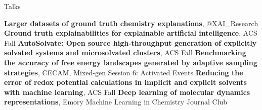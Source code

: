 \begin{rubric}{Talks}

\entry*[\hspace{1.05cm}2023] \textbf{Larger datasets of ground truth chemistry explanations}, $@$XAI\_Research
\entry*[\hspace{1.05cm}2022] \textbf{Ground truth explainabilities for explainable artificial intelligence}, ACS Fall
\entry*[\hspace{1.05cm}2022] \textbf{AutoSolvate: Open source high-throughput generation of explicitly solvated systems and microsolvated clusters}, ACS Fall
\entry*[\hspace{1.05cm}2021] \textbf{Benchmarking the accuracy of free energy landscapes generated by adaptive sampling strategies}, CECAM, Mixed-gen Session 6: Activated Events
\entry*[\hspace{1.05cm}2021] \textbf{Reducing the error of redox potential calculations in implicit and explicit solvents with machine learning}, ACS Fall
\entry*[\hspace{1.05cm}2020] \textbf{Deep learning of molecular dynamics representations}, Emory Machine Learning in Chemistry Journal Club
\end{rubric}


